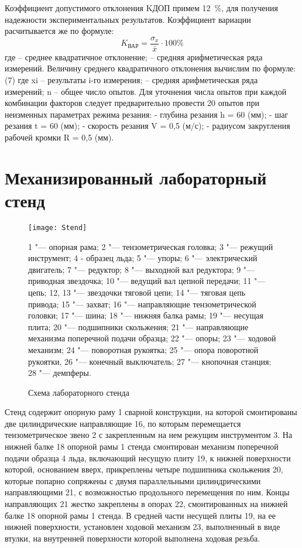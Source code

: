 Коэффициент допустимого отклонения KДОП примем 12~\%, для получения надежности экспериментальных результатов.
Коэффициент вариации расчитывается же по формуле:
\begin{equation}
\label{eq:var}
K_{\text{ВАР}}=\frac{\sigma_x}{\bar{x}}\cdot100\%
\end{equation}
где	  – среднее квадратичное отклонение;
– средняя арифметическая ряда измерений.
Величину среднего квадратичного отклонения вычислим по формуле:
(7)
где	xi – результаты i-го измерения;
– средняя арифметическая ряда измерений;
n – общее число опытов.
Для уточнения числа опытов при каждой комбинации факторов следует предварительно провести 20 опытов при неизменных параметрах режима резания:
- глубина резания h = 60 (мм);
- шаг резания t = 60 (мм);
- скорость резания V = 0,5 (м/с);
- радиусом закругления рабочей кромки R = 0,5 (мм).



\section{Механизированный лабораторный стенд}\label{sect2_3}

\begin{figure} [htbp]
	\center
	\texttt{[image: Stend]}
	
	1 "--- опорная рама; 2 "--- тензометрическая головка; 3 "--- режущий инструмент; 4 - образец льда; 5 "--- упоры; 6 "--- электрический двигатель; 7 "--- редуктор; 8 "--- выходной вал редуктора; 9 "--- приводная звездочка; 10 "--- ведущий вал цепной передачи; 11 "--- цепь; 12, 13 "--- звездочки тяговой цепи; 14 "--- тяговая цепь привода; 15 "--- захват; 16 "--- направляющие тензометрической головки; 17 "--- шина; 18 "--- нижняя балка рамы; 19 "--- несущая плита; 20 "--- подшипники скольжения; 21 "--- направляющие механизма поперечной подачи образца; 22 "--- опоры; 23 "--- ходовой механизм; 24 "--- поворотная рукоятка; 25 "--- опора поворотной рукоятки, 26 "--- конечный выключатель; 27 "--- кнопочная станция; 28 "--- демпферы.
	\caption{Схема лабораторного стенда} 
	\label{img:Stend}  
\end{figure}

Стенд содержит опорную раму 1 сварной конструкции, на которой смонтированы две цилиндрические направляющие 16, по которым перемещается тензометрическое звено 2 с закрепленным на нем режущим инструментом 3. На нижней балке 18 опорной рамы 1 стенда смонтирован механизм поперечной подачи образца 4 льда, включающий несущую плиту 19, к нижней поверхности которой, основанием вверх, прикреплены четыре подшипника скольжения 20, которые попарно сопряжены с двумя параллельными цилиндрическими направляющими 21, с возможностью продольного перемещения по ним. Концы направляющих 21 жестко закреплены в опорах 22, смонтированных на нижней балке 18 опорной рамы 1 стенда. В средней части несущей плиты 19, на ее нижней поверхности, установлен ходовой механизм 23, выполненный в виде втулки, на внутренней поверхности которой выполнена ходовая резьба.
 

